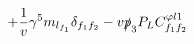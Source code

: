 %
\begin{dmath*}
%
  +  \frac{1}{v}\gamma^5 m_{l_{f_1}} \delta_{f_1 f_2}  -  v\slashed{p}_{3} P_L C^{ \varphi  l1}_{f_1 f_2}
%
\end{dmath*}
%

